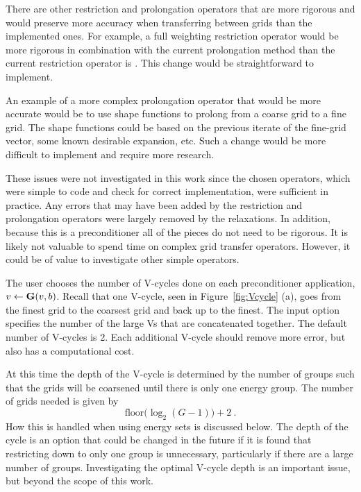 There are other restriction and prolongation operators that are more rigorous and would preserve more accuracy when transferring between grids than the implemented ones. For example, a full weighting restriction operator would be more rigorous in combination with the current prolongation method than the current restriction operator is \cite{Briggs2000}. This change would be straightforward to implement. 

An example of a more complex prolongation operator that would be more accurate would be to use shape functions to prolong from a coarse grid to a fine grid. The shape functions could be based on the previous iterate of the fine-grid vector, some known desirable expansion, etc. Such a change would be more difficult to implement and require more research. 

These issues were not investigated in this work since the chosen operators, which were simple to code and check for correct implementation, were sufficient in practice. Any errors that may have been added by the restriction and prolongation operators were largely removed by the relaxations. In addition, because this is a preconditioner all of the pieces do not need to be rigorous. It is likely not valuable to spend time on complex grid transfer operators. However, it could be of value to investigate other simple operators. 

The user chooses the number of V-cycles done on each preconditioner application, $v \leftarrow \mathbf{G}(v,b)$. Recall that one V-cycle, seen in Figure~\ref{fig:Vcycle} (a), goes from the finest grid to the coarsest grid and back up to the finest. The input option specifies the number of the large Vs that are concatenated together. The default number of V-cycles is 2. Each additional V-cycle should remove more error, but also has a computational cost. 

At this time the depth of the V-cycle is determined by the number of groups such that the grids will be coarsened until there is only one energy group. The number of grids needed is given by \cite{BinaryTree2011}
\begin{equation}
  \text{floor}\bigl( \log_{2}(G-1) \bigr) + 2 \:.
  \label{eq:NumGrids}
\end{equation}
%
How this is handled when using energy sets is discussed below. The depth of the cycle is an option that could be changed in the future if it is found that restricting down to only one group is unnecessary, particularly if there are a large number of groups. Investigating the optimal V-cycle depth is an important issue, but beyond the scope of this work. 

